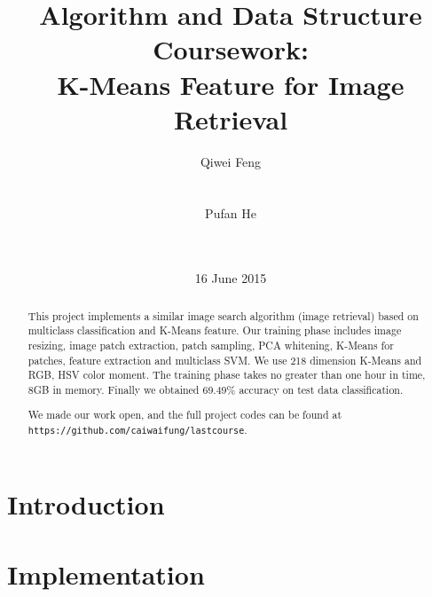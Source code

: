 \documentclass{acm_proc_article-sp}
\begin{document}
\title{Algorithm and Data Structure Coursework: \\K-Means Feature for
Image Retrieval}
\subtitle{}
%
%
\author{\alignauthor
Qiwei Feng\\
       \\
       \\
\alignauthor
Pufan He\\
       \\
       \\
}
\date{16 June 2015}

\maketitle
\begin{abstract}
        This project implements a similar image search algorithm (image
        retrieval) based on multiclass classification and K-Means feature. Our
        training phase includes image resizing, image patch extraction, patch
        sampling, PCA whitening, K-Means for patches, feature extraction and
        multiclass SVM. We use 218 dimension K-Means and RGB, HSV color moment.
        The training phase takes no greater than one hour in time, 8GB in memory.
        Finally we obtained 69.49\% accuracy on test data classification.

We made our work open, and the full project codes can be found at
\texttt{https://github.com/caiwaifung/lastcourse}.
\end{abstract}


\section{Introduction}

\section{Implementation}
\end{document}
